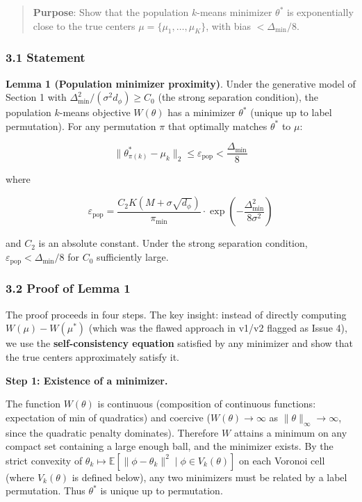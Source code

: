 \documentclass[
  12pt,
]{ctexart}
\begin{document}
\begin{quote}
\textbf{Purpose}: Show that the population \(k\)-means minimizer
\(\theta^*\) is exponentially close to the true centers
\(\mu = \{\mu_1,\dots,\mu_K\}\), with bias \(< \Delta_{\min}/8\).
\end{quote}

\subsubsection{3.1 Statement}\label{statement}

\textbf{Lemma 1 (Population minimizer proximity)}. Under the generative
model of Section 1 with \(\Delta_{\min}^2 / (\sigma^2 d_\phi) \geq C_0\)
(the strong separation condition), the population \(k\)-means objective
\(W(\theta)\) has a minimizer \(\theta^*\) (unique up to label
permutation). For any permutation \(\pi\) that optimally matches
\(\theta^*\) to \(\mu\):

\[\|\theta^*_{\pi(k)} - \mu_k\|_2 \leq \varepsilon_{\text{pop}} < \frac{\Delta_{\min}}{8}\]

where

\[\varepsilon_{\text{pop}} = \frac{C_2 K (M + \sigma\sqrt{d_\phi})}{\pi_{\min}} \cdot \exp\left(-\frac{\Delta_{\min}^2}{8\sigma^2}\right)\]

and \(C_2\) is an absolute constant. Under the strong separation
condition, \(\varepsilon_{\text{pop}} < \Delta_{\min}/8\) for \(C_0\)
sufficiently large.

\subsubsection{3.2 Proof of Lemma 1}\label{proof-of-lemma-1}

The proof proceeds in four steps. The key insight: instead of directly
computing \(W(\mu) - W(\mu^*)\) (which was the flawed approach in v1/v2
flagged as Issue 4), we use the \textbf{self-consistency equation}
satisfied by any minimizer and show that the true centers approximately
satisfy it.

\textbf{Step 1: Existence of a minimizer.}

The function \(W(\theta)\) is continuous (composition of continuous
functions: expectation of min of quadratics) and coercive
(\(W(\theta) \to \infty\) as \(\|\theta\|_\infty \to \infty\), since the
quadratic penalty dominates). Therefore \(W\) attains a minimum on any
compact set containing a large enough ball, and the minimizer exists. By
the strict convexity of
\(\theta_k \mapsto \mathbb{E}[\|\phi - \theta_k\|^2 \mid \phi \in V_k(\theta)]\)
on each Voronoi cell (where \(V_k(\theta)\) is defined below), any two
minimizers must be related by a label permutation. Thus \(\theta^*\) is
unique up to permutation.
\end{document}
